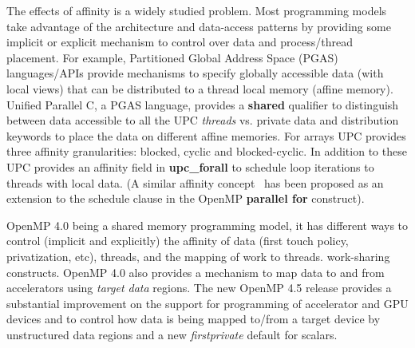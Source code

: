 The effects of affinity is a widely studied problem. Most programming models 
take advantage of the architecture and data-access patterns by providing some 
implicit or explicit mechanism to control over data and process/thread placement. For example,
Partitioned Global Address Space (PGAS) languages/APIs provide mechanisms to specify 
globally accessible data (with local views) that can be distributed to a thread local memory (affine memory). 
Unified Parallel C, a PGAS language, provides a \textbf{shared} qualifier to distinguish between data 
accessible to all the UPC \textit{threads} vs. private data and distribution keywords to place
the data on different affine memories. For arrays UPC provides 
three affinity granularities: blocked, cyclic and blocked-cyclic. In addition to these
UPC provides an affinity field in \textbf{upc\_forall} to schedule loop iterations to threads with local data.
(A similar affinity concept~\cite{nikolopoulos2001exploiting} has been proposed as an extension to the schedule clause in the OpenMP \textbf{parallel for} construct).

OpenMP 4.0 being a shared memory programming model, it has 
different ways to control (implicit and explicitly) the affinity of data (first touch policy, privatization, etc), threads, and the mapping of work to threads.
work-sharing constructs. OpenMP 4.0 also provides a mechanism to map data to and from accelerators using \textit{target data} regions. The new OpenMP 4.5 release provides a substantial 
improvement on the support for programming of accelerator and GPU devices and to control
how data is being mapped to/from a target device by unstructured data regions and a new \textit{firstprivate} default for scalars.

